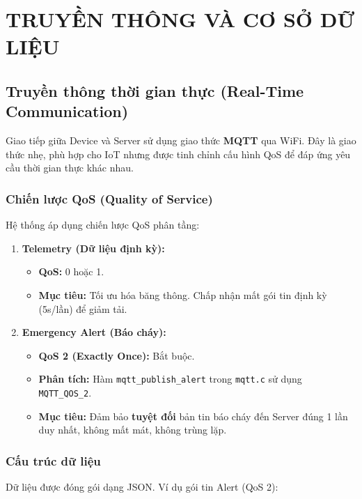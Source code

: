 \documentclass[12pt,a4paper]{report}
\begin{document}
\chapter{TRUYỀN THÔNG VÀ CƠ SỞ DỮ LIỆU}

\section{Truyền thông thời gian thực (Real-Time Communication)}
Giao tiếp giữa Device và Server sử dụng giao thức \textbf{MQTT} qua WiFi. Đây là giao thức nhẹ, phù hợp cho IoT nhưng được tinh chỉnh cấu hình QoS để đáp ứng yêu cầu thời gian thực khác nhau.

\subsection{Chiến lược QoS (Quality of Service)}
Hệ thống áp dụng chiến lược QoS phân tầng:

\begin{enumerate}
    \item \textbf{Telemetry (Dữ liệu định kỳ):}
    \begin{itemize}
        \item \textbf{QoS:} 0 hoặc 1.
        \item \textbf{Mục tiêu:} Tối ưu hóa băng thông. Chấp nhận mất gói tin định kỳ (5s/lần) để giảm tải.
    \end{itemize}
    
    \item \textbf{Emergency Alert (Báo cháy):}
    \begin{itemize}
        \item \textbf{QoS 2 (Exactly Once):} Bắt buộc.
        \item \textbf{Phân tích:} Hàm \texttt{mqtt\_publish\_alert} trong \texttt{mqtt.c} sử dụng \texttt{MQTT\_QOS\_2}.
        \item \textbf{Mục tiêu:} Đảm bảo \textbf{tuyệt đối} bản tin báo cháy đến Server đúng 1 lần duy nhất, không mất mát, không trùng lặp.
    \end{itemize}
\end{enumerate}

\subsection{Cấu trúc dữ liệu}
Dữ liệu được đóng gói dạng JSON. Ví dụ gói tin Alert (QoS 2):
\end{document}
